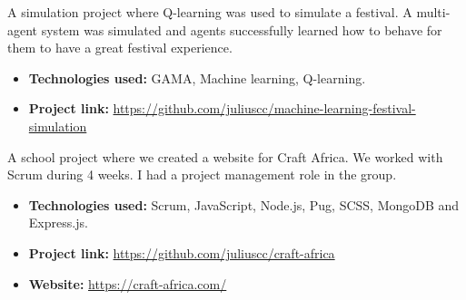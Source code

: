 \divider


A simulation project where Q-learning was used to simulate a festival. A multi-agent system was simulated and agents successfully learned how to behave for them to have a great festival experience.

\vspace{6pt}

\begin{itemize}
    \item \textbf{Technologies used:} GAMA, Machine learning, Q-learning.
    \item \textbf{Project link:} \href{https://github.com/juliuscc/machine-learning-festival-simulation}{https://github.com/juliuscc/machine-learning-festival-simulation}
\end{itemize}


\divider


A school project where we created a website for Craft Africa. We worked with Scrum during 4 weeks. I had a project management role in the group.

\vspace{6pt}

\begin{itemize}
    \item \textbf{Technologies used:} Scrum, JavaScript, Node.js, Pug, SCSS, MongoDB and Express.js.
    \item \textbf{Project link:} \href{https://github.com/juliuscc/craft-africa}{https://github.com/juliuscc/craft-africa}
    \item \textbf{Website:} \href{https://craft-africa.com/}{https://craft-africa.com/}
\end{itemize}
